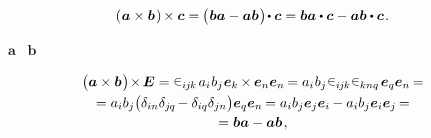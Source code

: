 \nopagebreak\vspace{-0.2em}
\begin{equation}
\left(\hspace{.1ex} \bm{a} \times \bm{b} \hspace{.2ex}\right) \hspace{-0.2ex} \times \bm{c}
= \hspace{-0.15ex} \bigl( \hspace{.1ex} \bm{b} \bm{a} - \bm{a} \bm{b} \hspace{.15ex} \bigr) \hspace{-0.3ex} \dotp \bm{c}
= \bm{b} \bm{a} \dotp \bm{c} - \bm{a} \bm{b} \dotp \bm{c}
\hspace{.2ex} .
\end{equation}

\vspace{-0.15em}\noindent
{}
~$\bm{a}$
~$\bm{b}$

\nopagebreak\vspace{-0.5em}
\begin{multline}\label{vectorcrossvectorcrossidentity}
\bigl( \bm{a} \times \bm{b} \hspace{.15ex}\bigr) \hspace{-0.33ex} \times \hspace{-0.22ex} \UnitDyad
= \permutationsparitysymbols{i\hspace{-0.1ex}j\hspace{-0.1ex}k} \hspace{.2ex} a_i \hspace{.1ex} b_j \hspace{.1ex} \bm{e}_k \hspace{-0.15ex} \times \hspace{-0.1ex} \bm{e}_n \bm{e}_n \hspace{-0.2ex}
= a_i \hspace{.1ex} b_j \hspace{.1ex} \permutationsparitysymbols{i\hspace{-0.1ex}j\hspace{-0.1ex}k} \permutationsparitysymbols{knq} \hspace{.2ex} \bm{e}_q \bm{e}_n \hspace{-0.2ex} =
\\[-0.1em]
%
= a_i b_j \bigl( \delta_{in} \delta_{j\hspace{-0.1ex}q} \hspace{-0.22ex} - \delta_{iq} \delta_{jn} \bigr) \bm{e}_q \bm{e}_n \hspace{-0.2ex}
= a_i b_j \bm{e}_j \bm{e}_i \hspace{-0.12ex} - a_i b_j \bm{e}_i \bm{e}_j \hspace{-0.2ex} =
\\[-0.1em]
%
= \bm{b} \bm{a} - \bm{a} \bm{b}
\hspace{.2ex},
\end{multline}

